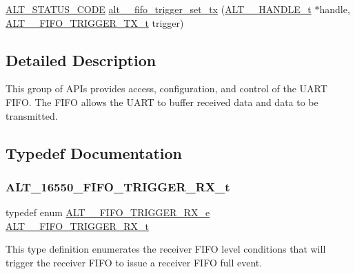 \begin{DoxyCompactItemize}
\item 
\mbox{\hyperlink{hwlib_8h_abdb0d369f069723ca55d6c94bcaaaa12}{A\+L\+T\+\_\+\+S\+T\+A\+T\+U\+S\+\_\+\+C\+O\+DE}} \mbox{\hyperlink{group__UART__FIFO_ga04495be392cdd03da90dc3480bb50927}{alt\+\_\+\_\+fifo\+\_\+trigger\+\_\+set\+\_\+tx}} (\mbox{\hyperlink{group__UART__BASIC_ga4173f362f19fc04032c3859b78d78119}{A\+L\+T\+\_\+\_\+\+H\+A\+N\+D\+L\+E\+\_\+t}} $\ast$handle, \mbox{\hyperlink{group__UART__FIFO_gac427c853fffa7be41f636f723b48a2e7}{A\+L\+T\+\_\+\_\+\+F\+I\+F\+O\+\_\+\+T\+R\+I\+G\+G\+E\+R\+\_\+\+T\+X\+\_\+t}} trigger)
\end{DoxyCompactItemize}


\subsection{Detailed Description}
This group of A\+P\+Is provides access, configuration, and control of the U\+A\+RT F\+I\+FO. The F\+I\+FO allows the U\+A\+RT to buffer received data and data to be transmitted. 

\subsection{Typedef Documentation}
\mbox{\label{group__UART__FIFO_ga6f6aa621e8111510517b92f57eb0987a}} 
\subsubsection{\texorpdfstring{ALT\_16550\_FIFO\_TRIGGER\_RX\_t}{ALT\_16550\_FIFO\_TRIGGER\_RX\_t}}
{\footnotesize\ttfamily typedef enum \mbox{\hyperlink{group__UART__FIFO_ga2bfcdb68fa8def11f82daafbdab9b32c}{A\+L\+T\+\_\+\_\+\+F\+I\+F\+O\+\_\+\+T\+R\+I\+G\+G\+E\+R\+\_\+\+R\+X\+\_\+e}}
 \mbox{\hyperlink{group__UART__FIFO_ga6f6aa621e8111510517b92f57eb0987a}{A\+L\+T\+\_\+\_\+\+F\+I\+F\+O\+\_\+\+T\+R\+I\+G\+G\+E\+R\+\_\+\+R\+X\+\_\+t}}}

This type definition enumerates the receiver F\+I\+FO level conditions that will trigger the receiver F\+I\+FO to issue a receiver F\+I\+FO full event. \mbox{\label{group__UART__FIFO_gac427c853fffa7be41f636f723b48a2e7}} 

